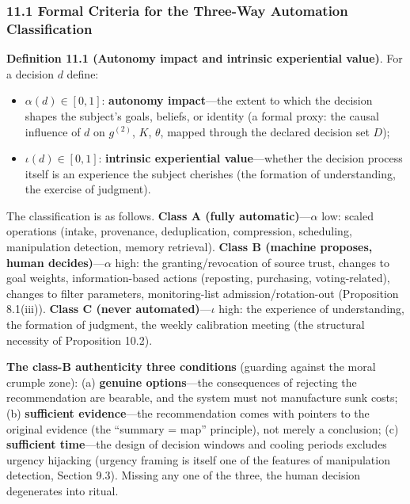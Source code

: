 \documentclass[
  11pt]{article}
\providecommand{\tightlist}{%
  \setlength{\itemsep}{0pt}\setlength{\parskip}{0pt}}
\begin{document}
\subsubsection{11.1 Formal Criteria for the Three-Way Automation
Classification}\label{formal-criteria-for-the-three-way-automation-classification}

\textbf{Definition 11.1 (Autonomy impact and intrinsic experiential
value)}. For a decision \(d\) define:

\begin{itemize}
\tightlist
\item
  \(\alpha(d) \in [0,1]\): \textbf{autonomy impact}---the extent to
  which the decision shapes the subject's goals, beliefs, or identity (a
  formal proxy: the causal influence of \(d\) on \(g^{(2)}\), \(K\),
  \(\theta\), mapped through the declared decision set \(D\));
\item
  \(\iota(d) \in [0,1]\): \textbf{intrinsic experiential
  value}---whether the decision process itself is an experience the
  subject cherishes (the formation of understanding, the exercise of
  judgment).
\end{itemize}

The classification is as follows. \textbf{Class A (fully
automatic)}---\(\alpha\) low: scaled operations (intake, provenance,
deduplication, compression, scheduling, manipulation detection, memory
retrieval). \textbf{Class B (machine proposes, human
decides)}---\(\alpha\) high: the granting/revocation of source trust,
changes to goal weights, information-based actions (reposting,
purchasing, voting-related), changes to filter parameters,
monitoring-list admission/rotation-out (Proposition 8.1(iii)).
\textbf{Class C (never automated)}---\(\iota\) high: the experience of
understanding, the formation of judgment, the weekly calibration meeting
(the structural necessity of Proposition 10.2).

\textbf{The class-B authenticity three conditions} (guarding against the
moral crumple zone): (a) \textbf{genuine options}---the consequences of
rejecting the recommendation are bearable, and the system must not
manufacture sunk costs; (b) \textbf{sufficient evidence}---the
recommendation comes with pointers to the original evidence (the
``summary = map'' principle), not merely a conclusion; (c)
\textbf{sufficient time}---the design of decision windows and cooling
periods excludes urgency hijacking (urgency framing is itself one of the
features of manipulation detection, Section 9.3). Missing any one of the
three, the human decision degenerates into ritual.
\end{document}
